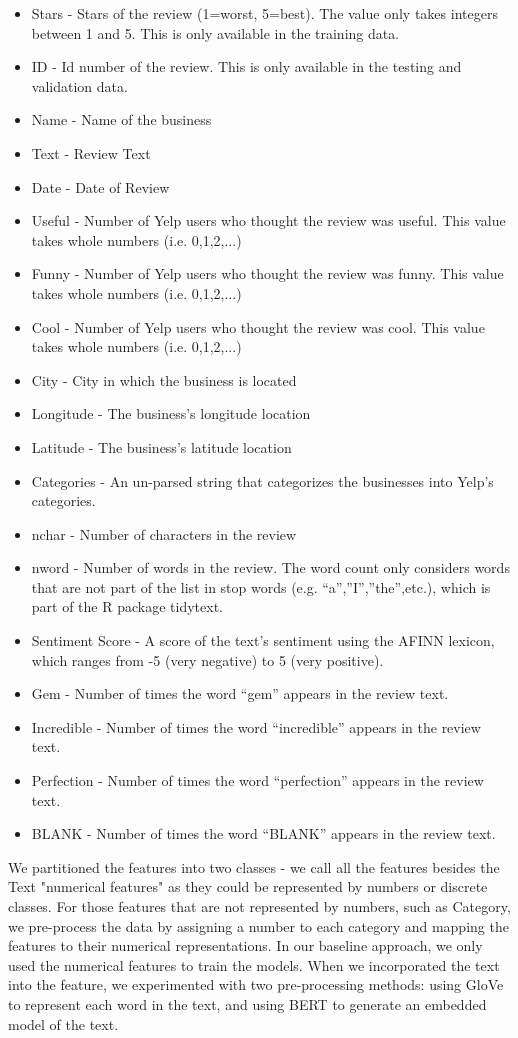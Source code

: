 \documentclass{article}
\begin{document}
\begin{itemize}
	\item Stars - Stars of the review (1=worst, 5=best). The value only takes integers between 1 and 5. This is only available in the training data.
	\item ID - Id number of the review. This is only available in the testing and
	validation data.
	\item Name - Name of the business
	\item Text - Review Text
	\item Date - Date of Review
	\item Useful - Number of Yelp users who thought the review was useful. This
	value takes whole numbers (i.e. 0,1,2,...)
	\item Funny - Number of Yelp users who thought the review was funny. This
	value takes whole numbers (i.e. 0,1,2,...)
	\item Cool - Number of Yelp users who thought the review was cool. This value
	takes whole numbers (i.e. 0,1,2,...)
	\item City - City in which the business is located
	\item Longitude - The business’s longitude location
	\item Latitude - The business’s latitude location
	\item Categories - An un-parsed string that categorizes the businesses into Yelp’s categories.
	\item nchar - Number of characters in the review
	\item nword - Number of words in the review. The word count only considers
	words that are not part of the list in stop words (e.g. “a”,”I”,”the”,etc.),
	which is part of the R package tidytext.
	\item Sentiment Score - A score of the text’s sentiment using the AFINN lexicon, which ranges from -5 (very negative) to 5 (very positive).
	\item Gem - Number of times the word “gem” appears in the review text.
	\item Incredible - Number of times the word “incredible” appears in the review
	text.
	\item Perfection - Number of times the word “perfection” appears in the review
	text.
	\item BLANK - Number of times the word “BLANK” appears in the review
	text.
\end{itemize}

We partitioned the features into two classes - we call all the features besides the Text "numerical features" as they could be represented by numbers or discrete classes. For those features that are not represented by numbers, such as Category, we pre-process the data by assigning a number to each category and mapping the features to their numerical representations. In our baseline approach, we only used the numerical features to train the models. When we incorporated the text into the feature, we experimented with two pre-processing methods: using GloVe to represent each word in the text, and using BERT to generate an embedded model of the text. 
\end{document}
